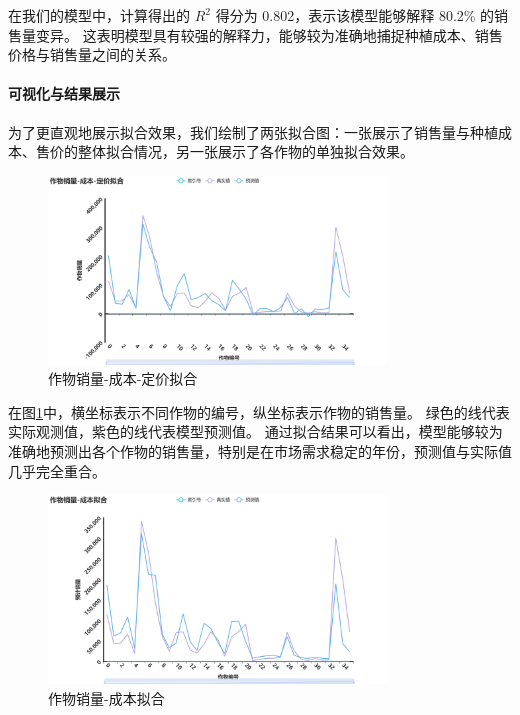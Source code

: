 \documentclass[12pt,a4paper]{nmmcm}
\begin{document}
在我们的模型中，计算得出的 $R^2$ 得分为 0.802，表示该模型能够解释 80.2\% 的销售量变异。
这表明模型具有较强的解释力，能够较为准确地捕捉种植成本、销售价格与销售量之间的关系。


\paragraph{可视化与结果展示}

为了更直观地展示拟合效果，我们绘制了两张拟合图：一张展示了销售量与种植成本、售价的整体拟合情况，另一张展示了各作物的单独拟合效果。


\begin{figure}[H]
  \centering
  \includegraphics[width=0.8\textwidth]{figures/prob3/correlation/作物销量-成本-定价拟合.png}
  \caption{作物销量-成本-定价拟合}
  \label{fig:fitting1}
\end{figure}

在图\ref{fig:fitting1}中，横坐标表示不同作物的编号，纵坐标表示作物的销售量。
绿色的线代表实际观测值，紫色的线代表模型预测值。
通过拟合结果可以看出，模型能够较为准确地预测出各个作物的销售量，特别是在市场需求稳定的年份，预测值与实际值几乎完全重合。


\begin{figure}[H]
  \centering
  \includegraphics[width=0.8\textwidth]{figures/prob3/correlation/作物销量-成本拟合.png}
  \caption{作物销量-成本拟合}
  \label{fig:fitting2}
\end{figure}
\end{document}
